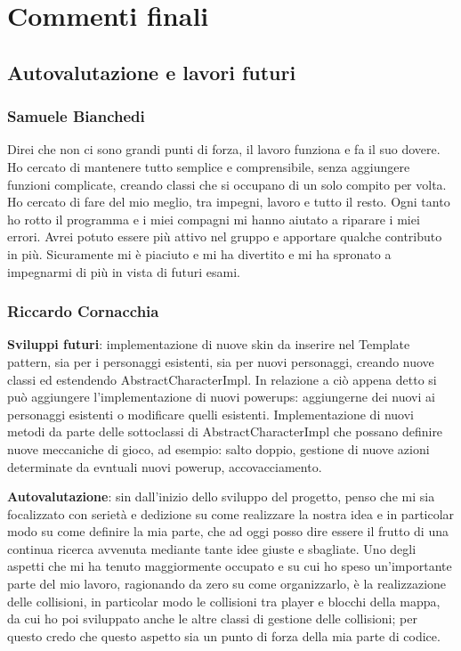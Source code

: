 \documentclass[a4paper,12pt]{report}
\begin{document}
\chapter{Commenti finali}
\section{Autovalutazione e lavori futuri}
\subsection{Samuele Bianchedi}
Direi che non ci sono grandi punti di forza, il lavoro funziona e fa il suo dovere. Ho cercato di mantenere tutto semplice e comprensibile,
senza aggiungere funzioni complicate, creando classi che si occupano di un solo compito per volta.
Ho cercato di fare del mio meglio, tra impegni, lavoro e tutto il resto. Ogni tanto ho rotto il programma e i miei compagni mi hanno aiutato
a riparare i miei errori. Avrei potuto essere più attivo nel gruppo e apportare qualche contributo in più.
Sicuramente mi è piaciuto e mi ha divertito e mi ha spronato a impegnarmi di più in vista di futuri esami.
\subsection{Riccardo Cornacchia}
\textbf{Sviluppi futuri}: implementazione di nuove skin da inserire nel Template pattern, sia per i personaggi esistenti, sia per 
nuovi personaggi, creando nuove classi ed estendendo AbstractCharacterImpl.
In relazione a ciò appena detto si può aggiungere l'implementazione di nuovi powerups: aggiungerne dei nuovi ai personaggi esistenti o 
modificare quelli esistenti.
Implementazione di nuovi metodi da parte delle sottoclassi di AbstractCharacterImpl che possano definire nuove meccaniche di gioco, 
ad esempio: salto doppio, gestione di nuove azioni determinate da evntuali nuovi powerup, accovacciamento.

\textbf{Autovalutazione}: sin dall'inizio dello sviluppo del progetto, penso che mi sia focalizzato con serietà e dedizione su come 
realizzare la nostra idea e in particolar modo su come definire la mia parte, che ad oggi posso dire essere il frutto di una continua 
ricerca avvenuta mediante tante idee giuste e sbagliate.
Uno degli aspetti che mi ha tenuto maggiormente occupato e su cui ho speso un'importante parte del mio lavoro, ragionando da zero 
su come organizzarlo, è la realizzazione delle collisioni, in particolar modo le collisioni tra player e blocchi della mappa, da cui ho 
poi sviluppato anche le altre classi di gestione delle collisioni; per questo credo che questo aspetto sia un punto di forza della 
mia parte di codice.
\end{document}
